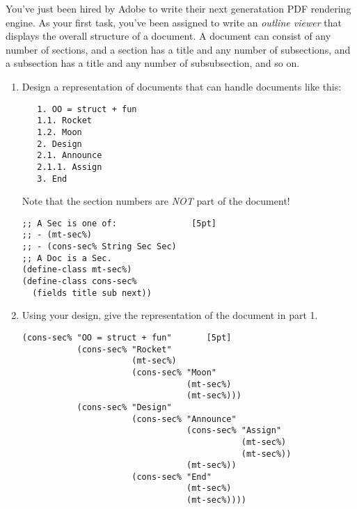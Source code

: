 \documentclass[12pt]{article}                   %
\def\pts#1{\marginpar{\footnotesize \raggedright  \fbox{#1 {\sc Points}}}}
\newenvironment{solution}{}{}
\begin{document}
\vfill\thispagestyle{empty}
\newpage

\fi

\begin{problem}\pts{18}

You've just been hired by Adobe to write their next generatation PDF
rendering engine.  As your first task, you've been assigned to write
an \emph{outline viewer} that displays the overall structure of a
document.  A document can consist of any number of sections, and a
section has a title and any number of subsections, and a subsection
has a title and any number of subsubsection, and so on.

\begin{enumerate}
\item Design a representation of documents that can handle
documents like this:
\begin{verbatim}
   1. OO = struct + fun
   1.1. Rocket
   1.2. Moon
   2. Design
   2.1. Announce
   2.1.1. Assign
   3. End
\end{verbatim}

Note that the section numbers are \emph{NOT} part of the document!

\begin{solution}
\begin{verbatim}
;; A Sec is one of:               [5pt]
;; - (mt-sec%)
;; - (cons-sec% String Sec Sec)
;; A Doc is a Sec.
(define-class mt-sec%)  
(define-class cons-sec% 
  (fields title sub next))
\end{verbatim}
\end{solution}

\newpage
\item Using your design, give the representation of the document in
  part 1.

\begin{solution}
\begin{verbatim}
(cons-sec% "OO = struct + fun"       [5pt]
           (cons-sec% "Rocket" 
                      (mt-sec%)
                      (cons-sec% "Moon" 
                                 (mt-sec%)
                                 (mt-sec%)))
           (cons-sec% "Design"
                      (cons-sec% "Announce"
                                 (cons-sec% "Assign" 
                                            (mt-sec%) 
                                            (mt-sec%))
                                 (mt-sec%))
                      (cons-sec% "End" 
                                 (mt-sec%) 
                                 (mt-sec%))))
\end{verbatim}
\end{solution}


\end{enumerate}
\end{problem}
\end{document}
